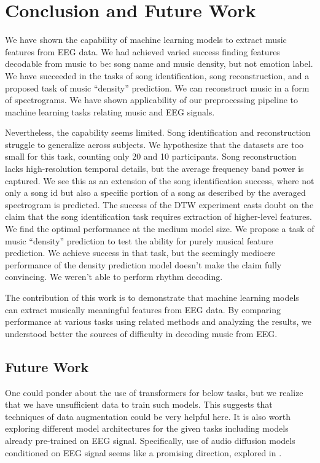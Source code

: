
\chapter{Conclusion and Future Work}

We have shown the capability of machine learning models to extract music features from EEG data.
We had achieved varied success finding features decodable from music to be: song name and music density, but not emotion label. 
We have succeeded in the tasks of song identification, song reconstruction, and a proposed task of music ``density'' prediction.
We can reconstruct music in a form of spectrograms.
We have shown applicability of our preprocessing pipeline to machine learning tasks relating music and EEG signals.

Nevertheless, the capability seems limited.
Song identification and reconstruction struggle to generalize across subjects. 
We hypothesize that the datasets are too small for this task, counting only 20 and 10 participants.
Song reconstruction lacks high-resolution temporal details, but the average frequency band power is captured. 
We see this as an extension of the song identification success, where not only a song id but also a specific portion of a song as described by the averaged spectrogram is predicted.
The success of the DTW experiment casts doubt on the claim that the song identification task requires extraction of higher-level features.
We find the optimal performance at the medium model size.
We propose a task of music ``density'' prediction to test the ability for purely musical feature prediction.
We achieve success in that task, but the seemingly mediocre performance of the density prediction model doesn't make the claim fully convincing.
We weren't able to perform rhythm decoding.

The contribution of this work is to demonstrate that machine learning models can extract musically meaningful features from EEG data.
By comparing performance at various tasks using related methods and analyzing the results, we understood better the sources of difficulty in decoding music from EEG.

\section{Future Work}

One could ponder about the use of transformers for below tasks, but we realize that we have unsufficient data to train such models.
This suggests that techniques of data augmentation could be very helpful here.
It is also worth exploring different model architectures for the given tasks including models already pre-trained on EEG signal.
Specifically, use of audio diffusion models conditioned on EEG signal seems like a promising direction, explored in \cite{postolache}.